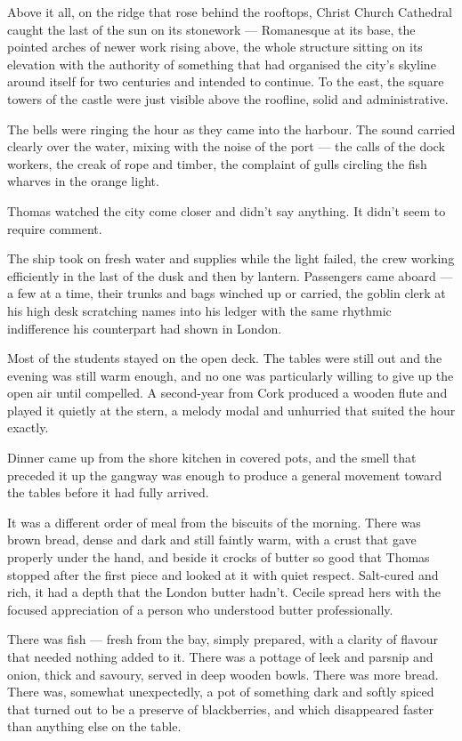 Above it all, on the ridge that rose behind the rooftops, Christ Church Cathedral caught the last of the sun on its stonework --- Romanesque at its base, the pointed arches of newer work rising above, the whole structure sitting on its elevation with the authority of something that had organised the city's skyline around itself for two centuries and intended to continue. To the east, the square towers of the castle were just visible above the roofline, solid and administrative.

The bells were ringing the hour as they came into the harbour. The sound carried clearly over the water, mixing with the noise of the port --- the calls of the dock workers, the creak of rope and timber, the complaint of gulls circling the fish wharves in the orange light.

Thomas watched the city come closer and didn't say anything. It didn't seem to require comment.

The ship took on fresh water and supplies while the light failed, the crew working efficiently in the last of the dusk and then by lantern. Passengers came aboard --- a few at a time, their trunks and bags winched up or carried, the goblin clerk at his high desk scratching names into his ledger with the same rhythmic indifference his counterpart had shown in London.

Most of the students stayed on the open deck. The tables were still out and the evening was still warm enough, and no one was particularly willing to give up the open air until compelled. A second-year from Cork produced a wooden flute and played it quietly at the stern, a melody modal and unhurried that suited the hour exactly.


Dinner came up from the shore kitchen in covered pots, and the smell that preceded it up the gangway was enough to produce a general movement toward the tables before it had fully arrived.

It was a different order of meal from the biscuits of the morning. There was brown bread, dense and dark and still faintly warm, with a crust that gave properly under the hand, and beside it crocks of butter so good that Thomas stopped after the first piece and looked at it with quiet respect. Salt-cured and rich, it had a depth that the London butter hadn't. Cecile spread hers with the focused appreciation of a person who understood butter professionally.

There was fish --- fresh from the bay, simply prepared, with a clarity of flavour that needed nothing added to it. There was a pottage of leek and parsnip and onion, thick and savoury, served in deep wooden bowls. There was more bread. There was, somewhat unexpectedly, a pot of something dark and softly spiced that turned out to be a preserve of blackberries, and which disappeared faster than anything else on the table.

